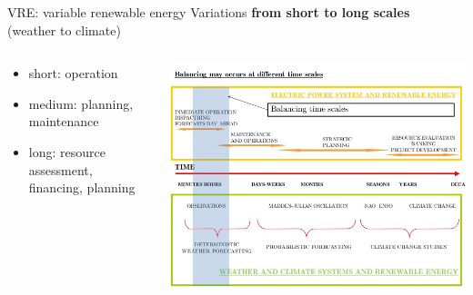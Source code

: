 \documentclass{beamer}%
\begin{document}
\begin{frame}{VRE: variable renewable energy}
\vspace{0.1\baselineskip}\centering Variations \textbf{from short to long scales}\\ (weather to climate)\\
\vspace{1\baselineskip}
\begin{columns}
  \begin{column}{0.4\textwidth}
\small{    \begin{itemize}
    \item \alert{short}: operation
    \item \alert{medium}: planning, maintenance
    \item \alert{long}: resource assessment, financing, planning
  \end{itemize}}    
\end{column}
\begin{column}{0.65\textwidth}
  \centering\includegraphics[width=1\textwidth]{timescales.jpg}
\end{column}
\end{columns}
\end{frame}

 
\end{document}
